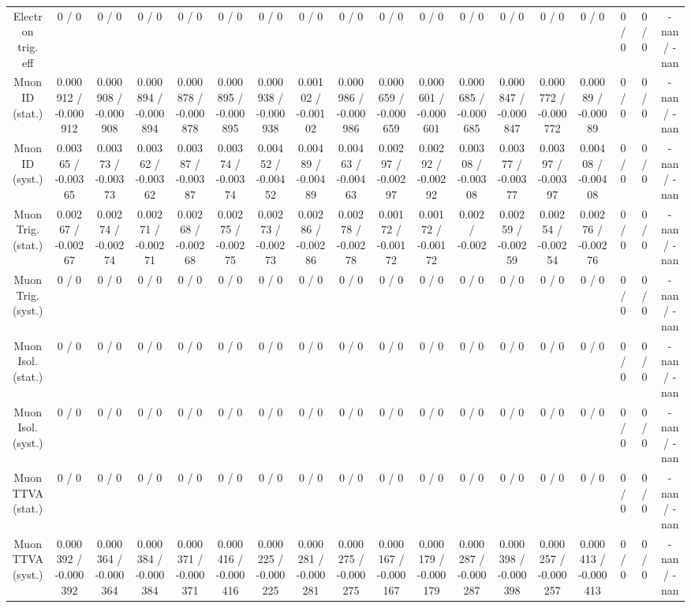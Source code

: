 \documentclass[10pt]{article}
\begin{document}
\begin{table}[htbp]
\begin{center}
\begin{tabular}{|c|c|c|c|c|c|c|c|c|c|c|c|c|c|c|c|c|c|}
  Electron trig. eff & 0 / 0 & 0 / 0 & 0 / 0 & 0 / 0 & 0 / 0 & 0 / 0 & 0 / 0 & 0 / 0 & 0 / 0 & 0 / 0 & 0 / 0 & 0 / 0 & 0 / 0 & 0 / 0 & 0 / 0 & 0 / 0 & -nan / -nan \\ 
  Muon ID (stat.) & 0.000912 / -0.000912 & 0.000908 / -0.000908 & 0.000894 / -0.000894 & 0.000878 / -0.000878 & 0.000895 / -0.000895 & 0.000938 / -0.000938 & 0.00102 / -0.00102 & 0.000986 / -0.000986 & 0.000659 / -0.000659 & 0.000601 / -0.000601 & 0.000685 / -0.000685 & 0.000847 / -0.000847 & 0.000772 / -0.000772 & 0.00089 / -0.00089 & 0 / 0 & 0 / 0 & -nan / -nan \\ 
  Muon ID (syst.) & 0.00365 / -0.00365 & 0.00373 / -0.00373 & 0.00362 / -0.00362 & 0.00387 / -0.00387 & 0.00374 / -0.00374 & 0.00452 / -0.00452 & 0.00489 / -0.00489 & 0.00463 / -0.00463 & 0.00297 / -0.00297 & 0.00292 / -0.00292 & 0.00308 / -0.00308 & 0.00377 / -0.00377 & 0.00397 / -0.00397 & 0.00408 / -0.00408 & 0 / 0 & 0 / 0 & -nan / -nan \\ 
  Muon Trig. (stat.) & 0.00267 / -0.00267 & 0.00274 / -0.00274 & 0.00271 / -0.00271 & 0.00268 / -0.00268 & 0.00275 / -0.00275 & 0.00273 / -0.00273 & 0.00286 / -0.00286 & 0.00278 / -0.00278 & 0.00172 / -0.00172 & 0.00172 / -0.00172 & 0.002 / -0.002 & 0.00259 / -0.00259 & 0.00254 / -0.00254 & 0.00276 / -0.00276 & 0 / 0 & 0 / 0 & -nan / -nan \\ 
  Muon Trig. (syst.) & 0 / 0 & 0 / 0 & 0 / 0 & 0 / 0 & 0 / 0 & 0 / 0 & 0 / 0 & 0 / 0 & 0 / 0 & 0 / 0 & 0 / 0 & 0 / 0 & 0 / 0 & 0 / 0 & 0 / 0 & 0 / 0 & -nan / -nan \\ 
  Muon Isol. (stat.) & 0 / 0 & 0 / 0 & 0 / 0 & 0 / 0 & 0 / 0 & 0 / 0 & 0 / 0 & 0 / 0 & 0 / 0 & 0 / 0 & 0 / 0 & 0 / 0 & 0 / 0 & 0 / 0 & 0 / 0 & 0 / 0 & -nan / -nan \\ 
  Muon Isol. (syst.) & 0 / 0 & 0 / 0 & 0 / 0 & 0 / 0 & 0 / 0 & 0 / 0 & 0 / 0 & 0 / 0 & 0 / 0 & 0 / 0 & 0 / 0 & 0 / 0 & 0 / 0 & 0 / 0 & 0 / 0 & 0 / 0 & -nan / -nan \\ 
  Muon TTVA (stat.) & 0 / 0 & 0 / 0 & 0 / 0 & 0 / 0 & 0 / 0 & 0 / 0 & 0 / 0 & 0 / 0 & 0 / 0 & 0 / 0 & 0 / 0 & 0 / 0 & 0 / 0 & 0 / 0 & 0 / 0 & 0 / 0 & -nan / -nan \\ 
  Muon TTVA (syst.) & 0.000392 / -0.000392 & 0.000364 / -0.000364 & 0.000384 / -0.000384 & 0.000371 / -0.000371 & 0.000416 / -0.000416 & 0.000225 / -0.000225 & 0.000281 / -0.000281 & 0.000275 / -0.000275 & 0.000167 / -0.000167 & 0.000179 / -0.000179 & 0.000287 / -0.000287 & 0.000398 / -0.000398 & 0.000257 / -0.000257 & 0.000413 / -0.000413 & 0 / 0 & 0 / 0 & -nan / -nan \\ 

\end{tabular}
\end{center}
\end{table}
\end{document}
